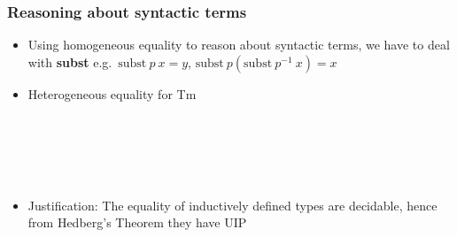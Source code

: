 \documentclass[12pt, mathserif,handout]{beamer}
\begin{document}
\begin{frame}

\frametitle{Reasoning about syntactic terms}
\begin{itemize}
\item Using homogeneous equality to reason about syntactic terms, we
  have to deal with \textbf{subst} e.g.\ $\text{subst}~ p~ x = y$, $\text{subst} ~p
  (\text{subst} ~p^{-1}~ x) = x$
\item Heterogeneous equality for Tm

\begin{code}\>\<%
\\
\>  \AgdaSymbol{\{} \AgdaSymbol{:} \AgdaSymbol{\}\{} \AgdaSymbol{:}  \AgdaSymbol{\}} \<[29]%
\>[29]\<%
\\
\>[2]\<[9]%
\>[9]\AgdaSymbol{:} \AgdaSymbol{\{} \AgdaSymbol{:}  \AgdaSymbol{\}}         \<%
\\
\>[0]\<[2]%
\>[2] \AgdaSymbol{:} \AgdaSymbol{(} \AgdaSymbol{:}  \AgdaSymbol{)}    \<%
\\
\>\<\end{code}

\item Justification: The equality of inductively defined types are
  decidable, hence from Hedberg's Theorem they have UIP
\end{itemize}
\end{frame}
\end{document}

